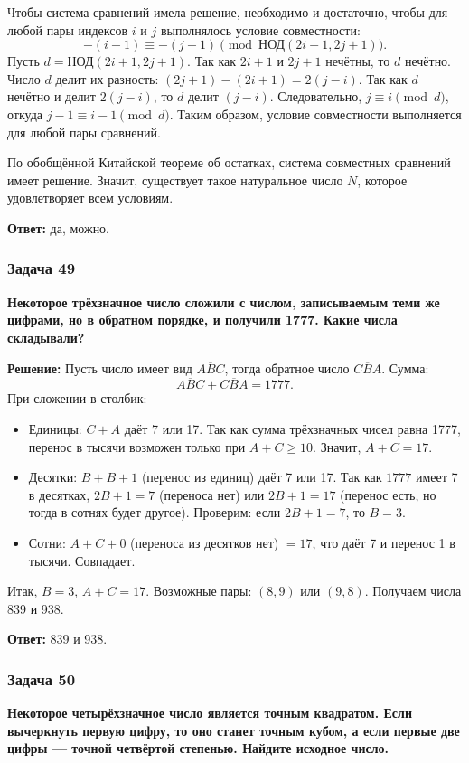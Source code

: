 \documentclass[12pt, a4paper]{article}
\begin{document}
Чтобы система сравнений имела решение, необходимо и достаточно, чтобы для любой пары индексов \(i\) и \(j\) выполнялось условие совместности:
\[
-(i-1) \equiv -(j-1) \pmod{\text{НОД}(2i+1, 2j+1)}.
\]
Пусть \(d = \text{НОД}(2i+1, 2j+1)\). Так как \(2i+1\) и \(2j+1\) нечётны, то \(d\) нечётно. 
Число \(d\) делит их разность: \((2j+1) - (2i+1) = 2(j-i)\). 
Так как \(d\) нечётно и делит \(2(j-i)\), то \(d\) делит \((j-i)\). 
Следовательно, \(j \equiv i \pmod d\), откуда \(j-1 \equiv i-1 \pmod d\).
Таким образом, условие совместности выполняется для любой пары сравнений.

По обобщённой Китайской теореме об остатках, система совместных сравнений имеет решение. Значит, существует такое натуральное число \(N\), которое удовлетворяет всем условиям.

\textbf{Ответ:} да, можно.

\subsubsection*{Задача 49}
\textbf{Некоторое трёхзначное число сложили с числом, записываемым теми же цифрами, но в обратном порядке, и получили 1777. Какие числа складывали?}

\textbf{Решение:}
Пусть число имеет вид $\overline{ABC}$, тогда обратное число $\overline{CBA}$. Сумма:
\[
\overline{ABC} + \overline{CBA} = 1777.
\]
При сложении в столбик:
\begin{itemize}
    \item Единицы: $C + A$ даёт 7 или 17. Так как сумма трёхзначных чисел равна 1777, перенос в тысячи возможен только при $A + C \ge 10$. Значит, $A + C = 17$.
    \item Десятки: $B + B + 1$ (перенос из единиц) даёт 7 или 17. Так как $1777$ имеет 7 в десятках, $2B + 1 = 7$ (переноса нет) или $2B + 1 = 17$ (перенос есть, но тогда в сотнях будет другое). Проверим: если $2B+1=7$, то $B=3$.
    \item Сотни: $A + C + 0$ (переноса из десятков нет) $= 17$, что даёт 7 и перенос 1 в тысячи. Совпадает.
\end{itemize}
Итак, $B=3$, $A+C=17$. Возможные пары: $(8,9)$ или $(9,8)$. Получаем числа 839 и 938.

\textbf{Ответ:} 839 и 938.

\subsubsection*{Задача 50}
\textbf{Некоторое четырёхзначное число является точным квадратом. Если вычеркнуть первую цифру, то оно станет точным кубом, а если первые две цифры — точной четвёртой степенью. Найдите исходное число.}
\end{document}
